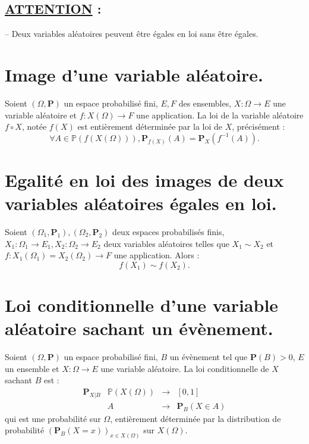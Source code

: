 \documentclass{article}
\begin{document}
\subsection*{\textbf{\underline{ATTENTION} :}}
\qquad -- Deux variables aléatoires peuvent être égales en loi sans être égales. 

\section{Image d'une variable aléatoire.}
Soient $(\Omega, \mathbf{P})$ un espace probabilisé fini, $E, F$ des ensembles, $X : \Omega \longrightarrow E$ une variable aléatoire et $f : X(\Omega) \longrightarrow F$ une application. La loi de la variable aléatoire $f \circ X$, notée $f(X)$ est entièrement déterminée par la loi de $X$, précisément : 
\[
    \forall A \in \mathbb{P}(f(X(\Omega))), \mathbf{P}_{f(X)}(A) = \mathbf{P}_X(f^{-1}(A)).
\] 

\section{Egalité en loi des images de deux variables aléatoires égales en loi.}

Soient $(\Omega_1, \mathbf{P}_1), (\Omega_2, \mathbf{P}_2)$ deux espaces probabilisés finis, $X_1 : \Omega_1 \longrightarrow E_1, X_2 : \Omega_2 \longrightarrow E_2$ deux variables aléatoires telles que $X_1 \sim X_2$ et $f : X_1(\Omega_1) = X_2(\Omega_2) \longrightarrow F$ une application. Alors : 
\[
    f(X_1) \sim f(X_2).
\]  

\section{Loi conditionnelle d'une variable aléatoire sachant un évènement.}

Soient $(\Omega, \mathbf{P})$ un espace probabilisé fini, $B$ un évènement tel que $\mathbf{P}(B) > 0$, $E$ un ensemble et $X : \Omega \longrightarrow E$ une variable aléatoire. La loi conditionnelle de $X$ sachant $B$ est : 
\[
    \begin{array}{c|ccc}
        \mathbf{P}_{X|B} & \mathbb{P}(X(\Omega)) & \longrightarrow & [0,1]
        \\[0.3em]
                         & A                     & \longrightarrow & \mathbf{P}_B(X \in A)
    \end{array}
\]
qui est une probabilité sur $\Omega$, entièrement déterminée par la distribution de probabilité $(\mathbf{P}_B(X = x))_{x \in X(\Omega)}$ sur $X(\Omega)$.
\end{document}
